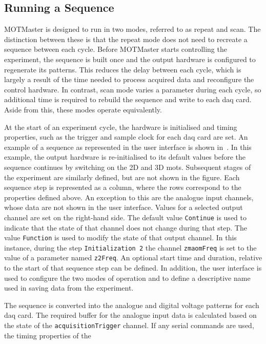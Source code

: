 \subsection{Running a Sequence}
MOTMaster is designed to run in two modes, referred to as repeat and scan.
The distinction between these is that the repeat mode does not need to
recreate a sequence between each cycle. Before MOTMaster starts controlling
the experiment, the sequence is built once and the output hardware is configured
to regenerate its patterns. This reduces the delay between
each cycle, which is largely a result of the time needed to process acquired
data and reconfigure the control hardware. In contrast, scan mode varies a
parameter during each cycle, so additional time is required to rebuild the
sequence and write to each \ac{daq} card. Aside from this, these modes
operate equivalently. \par\noindent
At the start of an experiment cycle, the hardware is
initialised and timing properties, such as the trigger and sample clock for
each \ac{daq} card are set. An example of a sequence as represented in
the user interface is shown in~. In
this example, the output hardware is re-initialised to its default
values before the sequence continues by switching on the 2D and 3D \ac{mots}. Subsequent stages of
the experiment are similarly defined, but are not shown in the figure. Each sequence step is represented as a column, where the rows
correspond to the properties defined above. An exception to this are
the analogue input channels, whose data are not shown in the user
interface. Values for a selected output channel are set on the right-hand
side. The default value \verb|Continue| is used to indicate that the
state of that channel does not change during that step. The value
\verb|Function| is used to modify the state of that output channel. In
this instance, during the step \verb|Initialization 2| the channel \verb|zmaomFreq| is set to the value of a
parameter named \verb|z2Freq|. An optional start time and duration,
relative to the start of that sequence step can be defined. In addition, the user interface is used to configure
the two modes of operation and to define a descriptive
name used in saving data from the experiment.
\par\noindent 
The sequence is 
converted into the analogue and digital voltage patterns for each \ac{daq}
card. The required buffer for the analogue input
data is calculated based on the state of the \verb|acquisitionTrigger|
channel. If any serial commands are used, the timing properties of the
